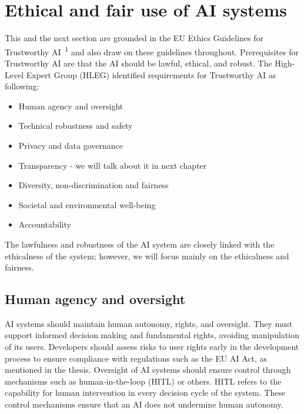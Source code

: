 \section{Ethical and fair use of AI systems}
This and the next section are grounded in the EU Ethics Guidelines for Trustworthy AI~\textsuperscript{1} and also draw on these guidelines throughout. Prerequisites for Trustworthy AI are that the AI should be lawful, ethical, and robust. The High-Level Expert Group (HLEG) identified requirements for Trustworthy AI as following:

\begin{itemize}
    \item{Human agency and oversight}
    \item{Technical robustness and safety}
    \item{Privacy and data governance}
    \item{Transparency - we will talk about it in next chapter}
    \item{Diversity, non-discrimination and fairness}
    \item{Societal and environmental well-being}
    \item{Accountability}
\end{itemize}

The lawfulness and robustness of the AI system are closely linked with the ethicalness of the system; however, we will focus mainly on the ethicalness and fairness.

\subsection*{Human agency and oversight}
AI systems should maintain human autonomy, rights, and oversight. They must support informed decision making and fundamental rights, avoiding manipulation of its users. Developers should assess risks to user rights early in the development process to ensure compliance with regulations such as the EU AI Act, as mentioned in the thesis. Oversight of AI systems should ensure control through mechanisms such as human-in-the-loop (HITL) or others. HITL refers to the capability for human intervention in every decision cycle of the system. These control mechanisms ensure that an AI does not undermine human autonomy.


